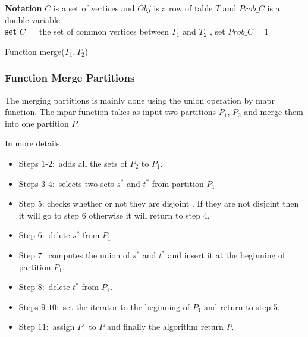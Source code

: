 \documentclass[12pt]{article}
\begin{document}
\begin{algorithm}[H]
\Indm  
{}

\textbf{Notation} $C$ is a set of vertices and $Obj$ is a row of table $T$ and $Prob\_C$ is a double variable\\
\Indp
\nl \textbf{set} $C=$ the set of common vertices between $T_1$ and $T_2$ , set $Prob\_C=1$\\
 \nl {}
\nl {}

 \caption{Function merge($T_1,T_2$)}
\end{algorithm}

\subsubsection{Function Merge Partitions }
\label{subsub:fMpar}
 The merging partitions is mainly done using the union operation by mapr function. The mpar function takes as input two partitions $P_1$, $P_2$ and merge them into one partition $P$.

In more details,  
\begin{itemize}[noitemsep,nolistsep]
\item Steps $1$-$2:$ adds all the sets of $P_2$ to $P_1$.
\item Steps $3$-$4:$ selects two sets $s^*$ and $t^*$ from partition $P_1$ 
\item Step $5$: checks whether or not they are disjoint . If they are  not disjoint then it will go to step 6 otherwise it will return to step 4.
\item Step $6:$ delete $s^*$ from $P_1$.
\item Step $7:$ computes the union of $s^*$ and $t^*$ and insert it at the beginning of partition $P_1$.
\item Step $8:$ delete $t^*$ from $P_1$.
\item Steps $9$-$10:$ set the iterator to the beginning of $P_1$ and return to step 5.
\item Step $11:$ assign $P_1$ to $P$ and finally the algorithm return $P$.
\end{itemize}
\end{document}
